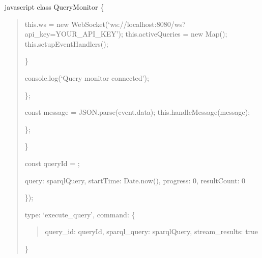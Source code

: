 \documentclass[letterpaper,10pt,english]{sphinxmanual}
\begin{document}
\sphinxAtStartPar
{\color{red}\bfseries{}\textasciigrave{}\textasciigrave{}}{\color{red}\bfseries{}\textasciigrave{}}javascript
class QueryMonitor \{
\begin{quote}
\begin{description}
\sphinxAtStartPar
this.ws = new WebSocket(‘ws://localhost:8080/ws?api\_key=YOUR\_API\_KEY’);
this.activeQueries = new Map();
this.setupEventHandlers();

\end{description}

\sphinxAtStartPar
\}
\begin{description}
\begin{description}
\sphinxAtStartPar
console.log(‘Query monitor connected’);

\end{description}

\sphinxAtStartPar
\};
\begin{description}
\sphinxAtStartPar
const message = JSON.parse(event.data);
this.handleMessage(message);

\end{description}

\sphinxAtStartPar
\};

\end{description}

\sphinxAtStartPar
\}
\begin{description}
\sphinxAtStartPar
const queryId = ;
\begin{description}
\sphinxAtStartPar
query: sparqlQuery,
startTime: Date.now(),
progress: 0,
resultCount: 0

\end{description}

\sphinxAtStartPar
\});
\begin{description}
\sphinxAtStartPar
type: ‘execute\_query’,
command: \{
\begin{quote}

\sphinxAtStartPar
query\_id: queryId,
sparql\_query: sparqlQuery,
stream\_results: true
\end{quote}

\sphinxAtStartPar
\}


\end{description}
\end{description}
\end{quote}
\end{document}

